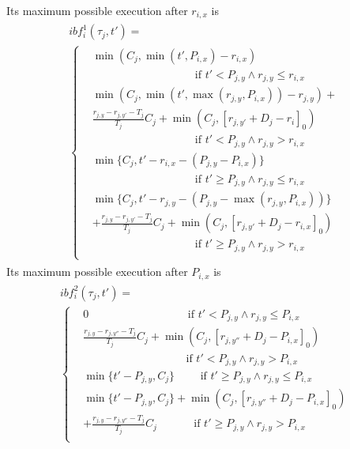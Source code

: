 Its maximum possible execution after $r_{i,x}$ is
\begin{align*}
\begin{split}
ibf_{i}^1(\tau_j,t')=~~~~~~~~~~~~~~~~~~~~~~~~~~~~~~~~~~~~~~~~~~~~~~\\
\begin{cases}
&\min(C_j,\min(t',P_{i,x})-r_{i,x})\\&\mbox{~~~~~~~~~~~~~~~~~~~~~~~~~~~~if } t'<P_{j,y}\wedge r_{j,y}\leq r_{i,x}\\
&\min(C_j,\min(t',\max(r_{j,y},P_{i,x}))-r_{j,y})+\\&\frac{r_{j,y}-r_{j,y'}-T_j}{T_j}C_j +\min(C_j,[r_{j,y'}+D_j-r_i]_0)\\
&\mbox{~~~~~~~~~~~~~~~~~~~~~~~~~~~~if } t'<P_{j,y}\wedge r_{j,y}> r_{i,x}\\
&\min\{C_j,t'-r_{i,x}-(P_{j,y}-P_{i,x})\}\\
&\mbox{~~~~~~~~~~~~~~~~~~~~~~~~~~~~if } t'\geq P_{j,y}\wedge r_{j,y}\leq r_{i,x}\\
&\min\{C_j,t'-r_{j,y}-(P_{j,y}-\max(r_{j,y},P_{i,x}))\}\\ &+\frac{r_{j,y}-r_{j,y'}-T_j}{T_j}C_j+\min(C_j,[r_{j,y'}+D_j-r_{i,x}]_0)\\
&\mbox{~~~~~~~~~~~~~~~~~~~~~~~~~~~~if } t'\geq P_{j,y}\wedge r_{j,y}> r_{i,x}\\
\end{cases}
\end{split}
\end{align*}
Its maximum possible execution after $P_{i,x}$ is
\begin{align*}
\begin{split}
ibf_{i}^2(\tau_j,t')=~~~~~~~~~~~~~~~~~~~~~~~~~~~~~~~~~~~~~~~~~~\\
\begin{cases}
&0\mbox{~~~~~~~~~~~~~~~~~~~~~~~~~~~if } t'<P_{j,y} \wedge r_{j,y}\leq P_{i,x}\\
&\frac{r_{j,y}-r_{j,y''}-T_j}{T_j}C_j+\min(C_j,[r_{j,y''}+D_j-P_{i,x}]_0)\\&
\mbox{~~~~~~~~~~~~~~~~~~~~~~~~~~~~if } t'<P_{j,y} \wedge r_{j,y}> P_{i,x}\\
&\min\{t'-P_{j,y},C_j\}\mbox{~~~~~~~if } t'\geq P_{j,y} \wedge  r_{j,y}\leq P_{i,x}\\
&\min\{t'-P_{j,y},C_j\}+\min(C_j,[r_{j,y''}+D_j-P_{i,x}]_0)\\
&+\frac{r_{j,y}-r_{j,y''}-T_j}{T_j}C_j\mbox{~~~~~~~~~~if } t'\geq P_{j,y} \wedge  r_{j,y}> P_{i,x}\\
\end{cases}
\end{split}
\end{align*}


